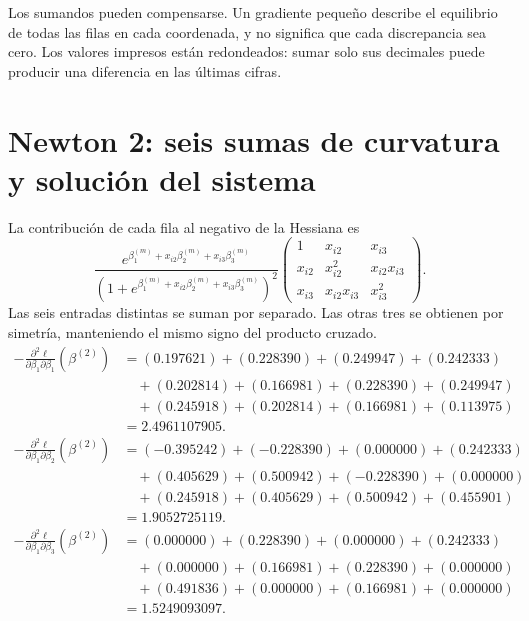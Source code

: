 \documentclass[11pt,a4paper]{article}
\begin{document}
Los sumandos pueden compensarse.
Un gradiente pequeño describe el equilibrio de todas las filas
en cada coordenada, y no significa que cada discrepancia sea cero.
Los valores impresos están redondeados: sumar solo sus decimales
puede producir una diferencia en las últimas cifras.

\clearpage
\section{Newton 2: seis sumas de curvatura y solución del sistema}\label{logit101}
\begingroup\small
\setlength{\abovedisplayskip}{3pt}\setlength{\belowdisplayskip}{3pt}
\setlength{\jot}{2pt}\setlength{\parskip}{3pt}
La contribución de cada fila al negativo de la Hessiana es
\[
\frac{e^{\beta_1^{(m)}+x_{i2}\beta_2^{(m)}+x_{i3}\beta_3^{(m)}}}
{(1+e^{\beta_1^{(m)}+x_{i2}\beta_2^{(m)}+x_{i3}\beta_3^{(m)}})^2}
\begin{pmatrix}
1&x_{i2}&x_{i3}\\
x_{i2}&x_{i2}^2&x_{i2}x_{i3}\\
x_{i3}&x_{i2}x_{i3}&x_{i3}^2
\end{pmatrix}.
\]
Las seis entradas distintas se suman por separado.
Las otras tres se obtienen por simetría, manteniendo el
mismo signo del producto cruzado.
\[
\begin{aligned}
-\frac{\partial^2\ell}{\partial\beta_1\partial\beta_1}(\beta^{(2)})&=(0.197621)+(0.228390)+(0.249947)+(0.242333)\\&\quad+(0.202814)+(0.166981)+(0.228390)+(0.249947)\\&\quad+(0.245918)+(0.202814)+(0.166981)+(0.113975)\\&=2.4961107905.\end{aligned}
\]
\[
\begin{aligned}
-\frac{\partial^2\ell}{\partial\beta_1\partial\beta_2}(\beta^{(2)})&=(-0.395242)+(-0.228390)+(0.000000)+(0.242333)\\&\quad+(0.405629)+(0.500942)+(-0.228390)+(0.000000)\\&\quad+(0.245918)+(0.405629)+(0.500942)+(0.455901)\\&=1.9052725119.\end{aligned}
\]
\[
\begin{aligned}
-\frac{\partial^2\ell}{\partial\beta_1\partial\beta_3}(\beta^{(2)})&=(0.000000)+(0.228390)+(0.000000)+(0.242333)\\&\quad+(0.000000)+(0.166981)+(0.228390)+(0.000000)\\&\quad+(0.491836)+(0.000000)+(0.166981)+(0.000000)\\&=1.5249093097.\end{aligned}
\]
\end{document}
